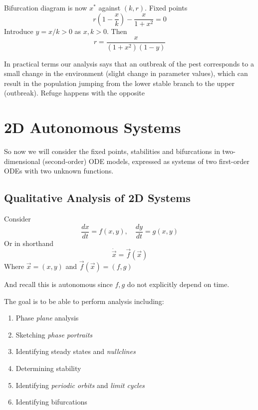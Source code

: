\documentclass{X:/Documents/Coding/Latex/myassignment}
\begin{document}


Bifurcation diagram is now $x^*$ against $(k,r)$. Fixed points 
\[r(1-\frac xk) - \frac{x}{1+x^2} = 0\]
Introduce $y=x/k > 0$ as $x,k>0$. Then
\[r = \frac{x}{(1+x^2)(1-y)}\]


In practical terms our analysis says that an outbreak of the pest corresponds to a small change in the environment (slight change in parameter values), which can result in the population jumping from the lower stable branch to the upper (outbreak). Refuge happens with the opposite


\section{2D Autonomous Systems}
So now we will consider the fixed points, stabilities and bifurcations in two-dimensional (second-order) ODE models, expressed as systems of two first-order ODEs with two unknown functions. 

\subsection{Qualitative Analysis of 2D Systems}
Consider
\[\frac{dx}{dt}= f(x,y), \quad \frac{dy}{dt} = g(x,y)\]
Or in shorthand
\[\dot{\vec x} = \vec f(\vec x)\]
Where $\vec x = (x,y)$ and $\vec f(\vec x) = \left(f,g\right)$

And recall this is autonomous since $f,g$ do not explicitly depend on time.


The goal is to be able to perform analysis including:
\begin{enumerate}
    \item Phase \textit{plane} analysis
    \item Sketching \textit{phase portraits}
    \item Identifying steady states and \textit{nullclines}
    \item Determining stability
    \item Identifying \textit{periodic orbits} and \textit{limit cycles}
    \item Identifying bifurcations
\end{enumerate}
\end{document}
